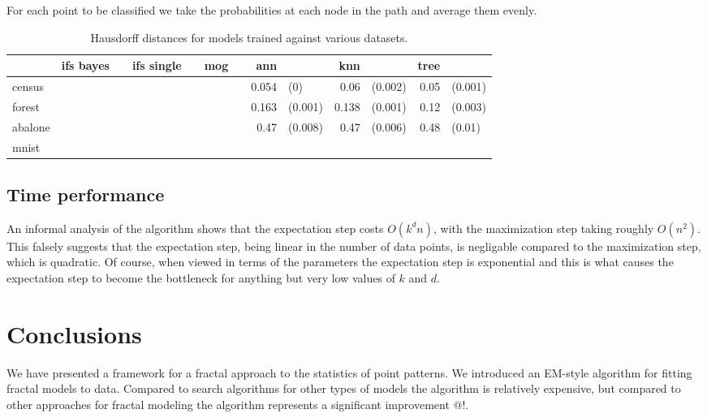 \documentclass[10pt]{article}
\theoremstyle{definition}
\begin{document}
For each point to be classified we take the probabilities at each node in the path and average them evenly.



\begin{table}
\begin{tabular}{| l | r l r l | r l r l  r l r l |}
\hline
  & ifs bayes & & ifs single & & mog & & ann & & knn & & tree & \\
\hline
census  & & & & & & & 0.054 &\color{gray}(0) & 0.06 & \color{gray} (0.002) & 0.05 & \color{gray} (0.001) \\
forest  & & & & & & & 0.163 &\color{gray}(0.001) & 0.138 &\color{gray}(0.001) & 0.12&\color{gray}(0.003) \\
abalone & & & & & & & 0.47 & \color{gray}(0.008) & 0.47 & \color{gray}(0.006) & 0.48 & \color{gray}(0.01) \\
mnist   & & & & & & & & & & & & \\
\hline

\end{tabular}
\caption{Hausdorff distances for models trained against various datasets.}
\label{classification-results}
\end{table}
\subsection{Time performance}

An informal analysis of the algorithm shows that the expectation step costs $O(k^dn)$, with the maximization step taking roughly $O(n^2)$. This falsely suggests that the expectation step, being linear in the number of data points, is negligable compared to the maximization step, which is quadratic. Of course, when viewed in terms of the parameters the expectation step is exponential and this is what causes the expectation step to become the bottleneck for anything but very low values of $k$ and $d$. 

\section{Conclusions}

We have presented a framework for a fractal approach to the statistics of point patterns. We introduced an EM-style algorithm for fitting fractal models to data. Compared to search algorithms for other types of models the algorithm is relatively expensive, but compared to other approaches for fractal modeling the algorithm represents a significant improvement @!. 
\end{document}
